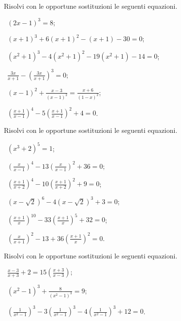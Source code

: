 \begin{esercizio}[\Ast]
\label{ese:5.33}
Risolvi con le opportune sostituzioni le seguenti equazioni.
 \begin{enumeratea}
 \item~$(2x-1)^3=8$;
 \item~$(x+1)^3+6(x+1)^2-(x+1)-30=0$;
 \item~$(x^2+1)^3-4(x^2+1)^2-19(x^2+1)-14=0$;
 \item~$\frac{3x}{x+1}-\left(\frac{3x}{x+1}\right)^3=0$;
 \item~$\left(x-1\right)^2+\frac{x-3}{\left(x-1\right)^2}=\frac{x+6}{(1-x)^2}$;
 \item~$\left(\frac{x+1}{x-1}\right)^4-5\left(\frac{x+1}{x-1}\right)^2+4=0$.
 \end{enumeratea}
\end{esercizio}

\begin{esercizio}
 \label{ese:5.34}
Risolvi con le opportune sostituzioni le seguenti equazioni.
\begin{multicols}{2}
 \begin{enumeratea}
 \item~$ (x^3+2)^5=1 $;
 \item~$ \left(\frac x{x-1}\right)^4-13\left(\frac x{x-1}\right)^2+36=0 $;
 \item~$ \left(\frac{x+1}{x+2}\right)^4-10\left(\frac{x+1}{x+2}\right)^2+9=0 $;
 \item~$ \left(x-\sqrt 2\right)^6-4\left(x-\sqrt 2\right)^3+3=0 $;
 \item~$ \left(\frac{x+1} x\right)^{10}-33\left(\frac{x+1} x\right)^5+32=0 $;
 \item~$ \left(\frac x{x+1}\right)^2-13+36\left(\frac{x+1} x\right)^2=0 $.
 \end{enumeratea}
\end{multicols}
\end{esercizio}

\begin{esercizio}
\label{ese:5.35}
Risolvi con le opportune sostituzioni le seguenti equazioni.
 \begin{enumeratea}
 \item~$ \frac{x-3}{x+3}+2=15\left(\frac{x+3}{x-3}\right) $;
 \item~$ \left(x^2-1\right)^3+\frac 8{\left(x^2-1\right)^3}=9 $;
 \item~$ \left(\frac 1{x^2-1}\right)^3-3\left(\frac 1{x^2-1}\right)^3-4\left(\frac 1{x^2-1}\right)^3+12=0 $.
 \end{enumeratea}
\end{esercizio}

